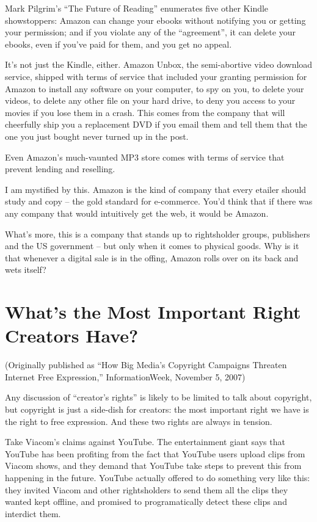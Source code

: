 Mark Pilgrim's ``The Future of Reading'' enumerates five other Kindle
showstoppers: Amazon can change your ebooks without notifying you
or getting your permission; and if you violate any of the
``agreement'', it can delete your ebooks, even if you've paid for
them, and you get no appeal.

It's not just the Kindle, either. Amazon Unbox, the semi-abortive
video download service, shipped with terms of service that included
your granting permission for Amazon to install any software on your
computer, to spy on you, to delete your videos, to delete any other
file on your hard drive, to deny you access to your movies if you
lose them in a crash. This comes from the company that will
cheerfully ship you a replacement DVD if you email them and tell
them that the one you just bought never turned up in the post.

Even Amazon's much-vaunted MP3 store comes with terms of service
that prevent lending and reselling.

I am mystified by this. Amazon is the kind of company that every
etailer should study and copy -- the gold standard for e-commerce.
You'd think that if there was any company that would intuitively
get the web, it would be Amazon.

What's more, this is a company that stands up to rightsholder
groups, publishers and the US government -- but only when it comes
to physical goods. Why is it that whenever a digital sale is in the
offing, Amazon rolls over on its back and wets itself?

\section{What's the Most Important Right Creators Have?}

(Originally published as ``How Big Media's Copyright Campaigns
Threaten Internet Free Expression,'' InformationWeek, November 5,
2007)

Any discussion of ``creator's rights'' is likely to be limited to
talk about copyright, but copyright is just a side-dish for
creators: the most important right we have is the right to free
expression. And these two rights are always in tension.

Take Viacom's claims against YouTube. The entertainment giant says
that YouTube has been profiting from the fact that YouTube users
upload clips from Viacom shows, and they demand that YouTube take
steps to prevent this from happening in the future. YouTube
actually offered to do something very like this: they invited
Viacom and other rightsholders to send them all the clips they
wanted kept offline, and promised to programatically detect these
clips and interdict them.

